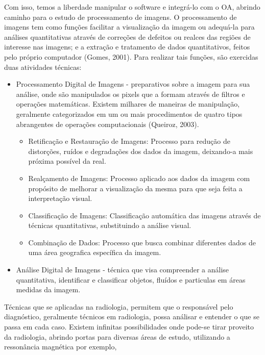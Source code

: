\documentclass[12pt,openright,oneside,a4paper,english,french,spanish,brazil]{unifil}
\begin{document}
Com isso, temos a liberdade manipular o software e integrá-lo com o OA, abrindo caminho para o estudo de processamento de imagens. O processamento de imagens tem como funções facilitar a visualização da imagem ou adequá-la para análises quantitativas através de correções de defeitos ou realces das regiões de interesse nas imagens; e a extração e tratamento de dados quantitativos, feitos pelo próprio computador (Gomes, 2001). Para realizar tais funções, são exercidas duas atividades técnicas:
\begin{itemize}
\item Processamento Digital de Imagens - preparativos sobre a imagem para sua análise, onde são manipulados os pixels que a formam através de filtros e operações matemáticas. Existem milhares de maneiras de manipulação, geralmente categorizados em um ou mais procedimentos de quatro tipos abrangentes de operações computacionais (Queiroz, 2003).
\begin{itemize}
\item Retificação e Restauração de Imagens: Processo para redução de distorções, ruídos e degradações dos dados da imagem, deixando-a mais próxima possível da real.
\item Realçamento de Imagens: Processo aplicado aos dados da imagem com propósito de melhorar a visualização da mesma para que seja feita a interpretação visual.
\item Classificação de Imagens: Classificação automática das imagens através de técnicas quantitativas, substituindo a análise visual.
\item Combinação de Dados: Processo que busca combinar diferentes dados de uma área geografica específica da imagem.
\end{itemize}

\item Análise Digital de Imagens - técnica que visa compreender a análise quantitativa, identificar e classificar objetos, fluídos e particulas em áreas medidas da imagem. 
\end{itemize}
Técnicas que se aplicadas na radiologia, permitem que o responsável pelo diagnóstico, geralmente técnicos em radiologia, possa análisar e entender o que se passa em cada caso. Existem infinitas possibilidades onde pode-se tirar proveito da radiologia, abrindo portas para diversas áreas de estudo, utilizando a ressonância magnética por exemplo,  

\end{document}
